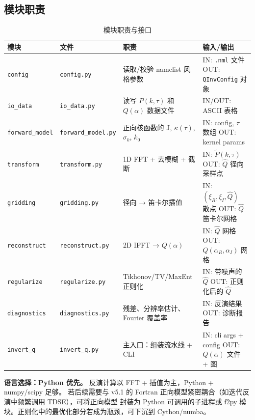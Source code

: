 \documentclass[11pt,a4paper]{ctexart}
\begin{document}
\subsection{模块职责}

\begin{table}[H]
\centering
\caption{模块职责与接口}
\begin{tabular}{p{2.5cm}p{3cm}p{4.5cm}p{3cm}}
\toprule
\textbf{模块} & \textbf{文件} & \textbf{职责} & \textbf{输入/输出} \\
\midrule
\texttt{config} & \texttt{config.py} & 读取/校验 namelist 风格参数 & IN: \texttt{.nml} 文件
    OUT: \texttt{QInvConfig} 对象 \\
\midrule
\texttt{io\_data} & \texttt{io\_data.py} & 读写 $P(k,\tau)$ 和 $Q(\alpha)$ 数据文件
    & IN/OUT: ASCII 表格 \\
\midrule
\texttt{forward\_model} & \texttt{forward\_model.py} & 正向核函数的 J, $\kappa(\tau)$,
    $\sigma_k$, $k_0$ & IN: config, $\tau$ 数组
    OUT: kernel params \\
\midrule
\texttt{transform} & \texttt{transform.py} & 1D FFT + 去模糊 + 截断
    & IN: $\tilde{P}(k,\tau)$
    OUT: $\hat{Q}$ 径向采样点 \\
\midrule
\texttt{gridding} & \texttt{gridding.py} & 径向 → 笛卡尔插值
    & IN: $(\xi_R,\xi_I, \hat{Q})$ 散点
    OUT: $\hat{Q}$ 笛卡尔网格 \\
\midrule
\texttt{reconstruct} & \texttt{reconstruct.py} & 2D IFFT → $Q(\alpha)$
    & IN: $\hat{Q}$ 网格
    OUT: $Q(\alpha_R,\alpha_I)$ 网格 \\
\midrule
\texttt{regularize} & \texttt{regularize.py} & Tikhonov/TV/MaxEnt 正则化
    & IN: 带噪声的 $\hat{Q}$
    OUT: 正则化后的 $\hat{Q}$ \\
\midrule
\texttt{diagnostics} & \texttt{diagnostics.py} & 残差、分辨率估计、Fourier 覆盖率
    & IN: 反演结果
    OUT: 诊断报告 \\
\midrule
\texttt{invert\_q} & \texttt{invert\_q.py} & 主入口：组装流水线 + CLI
    & IN: cli args + config
    OUT: $Q(\alpha)$ 文件 + 图 \\
\bottomrule
\end{tabular}
\end{table}

\begin{designbox}
\textbf{语言选择：Python 优先。} 反演计算以 FFT + 插值为主，Python + numpy/scipy 足够。
若后续需要与 v5.1 的 Fortran 正向模型紧密耦合（如迭代反演中频繁调用 TDSE），可将正向模型
封装为 Python 可调用的子进程或 f2py 模块。正则化中的最优化部分若成为瓶颈，可下沉到
Cython/numba。
\end{designbox}
\end{document}
